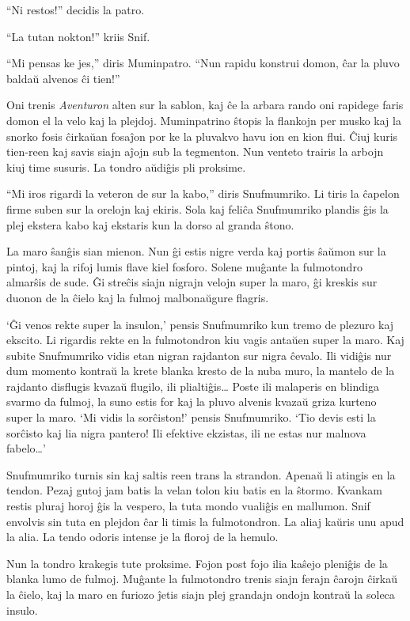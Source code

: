 ``Ni restos!'' decidis la patro.

``La tutan nokton!'' kriis Snif.

``Mi pensas ke jes,'' diris Muminpatro. ``Nun rapidu konstrui domon, ĉar la pluvo baldaŭ alvenos ĉi tien!''

Oni trenis \emph{Aventuron} alten sur la sablon, kaj ĉe la arbara rando oni rapidege faris domon el la velo kaj la plejdoj. Muminpatrino ŝtopis la flankojn per musko kaj la snorko fosis ĉirkaŭan fosaĵon por ke la pluvakvo havu ion en kion flui. Ĉiuj kuris tien-reen kaj savis siajn aĵojn sub la tegmenton. Nun venteto trairis la arbojn kiuj time susuris. La tondro aŭdiĝis pli proksime.

``Mi iros rigardi la veteron de sur la kabo,'' diris Snufmumriko. Li tiris la ĉapelon firme suben sur la orelojn kaj ekiris. Sola kaj feliĉa Snufmumriko plandis ĝis la plej ekstera kabo kaj ekstaris kun la dorso al granda ŝtono.

La maro ŝanĝis sian mienon. Nun ĝi estis nigre verda kaj portis ŝaŭmon sur la pintoj, kaj la rifoj lumis flave kiel fosforo. Solene muĝante la fulmotondro almarŝis de sude. Ĝi streĉis siajn nigrajn velojn super la maro, ĝi kreskis sur duonon de la ĉielo kaj la fulmoj malbonaŭgure flagris.

`Ĝi venos rekte super la insulon,' pensis Snufmumriko kun tremo de plezuro kaj ekscito. Li rigardis rekte en la fulmotondron kiu vagis antaŭen super la maro. Kaj subite Snufmumriko vidis etan nigran rajdanton sur nigra ĉevalo. Ili vidiĝis nur dum momento kontraŭ la krete blanka kresto de la nuba muro, la mantelo de la rajdanto disflugis kvazaŭ flugilo, ili plialtiĝis{\ldots} Poste ili malaperis en blindiga svarmo da fulmoj, la suno estis for kaj la pluvo alvenis kvazaŭ griza kurteno super la maro. `Mi vidis la sorĉiston!' pensis Snufmumriko. `Tio devis esti la sorĉisto kaj lia nigra pantero! Ili efektive ekzistas, ili ne estas nur malnova fabelo{\ldots}'

Snufmumriko turnis sin kaj saltis reen trans la strandon. Apenaŭ li atingis en la tendon. Pezaj gutoj jam batis la velan tolon kiu batis en la ŝtormo. Kvankam restis pluraj horoj ĝis la vespero, la tuta mondo vualiĝis en mallumon. Snif envolvis sin tuta en plejdon ĉar li timis la fulmotondron. La aliaj kaŭris unu apud la alia. La tendo odoris intense je la floroj de la hemulo.

Nun la tondro krakegis tute proksime. Fojon post fojo ilia kaŝejo pleniĝis de la blanka lumo de fulmoj. Muĝante la fulmotondro trenis siajn ferajn ĉarojn ĉirkaŭ la ĉielo, kaj la maro en furiozo ĵetis siajn plej grandajn ondojn kontraŭ la soleca insulo.


